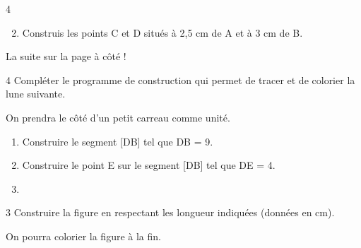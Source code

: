 \documentclass[a4paper]{book}
\begin{document}
{\begin{exerciceNote}{4}
        
        \begin{enumerate}
            \setcounter{enumi}{1}
            \item Construis les points C et D situés à 2,5 cm de A et à 3 cm de B.
        \end{enumerate}

        \begin{center}
        \end{center}
    \end{exerciceNote}

\vfill
\hfill La suite sur la page à côté !

\newpage


    \begin{exerciceNote}{4}
        Compléter le programme de construction qui permet de tracer et de colorier la lune suivante.

        On prendra le côté d'un petit carreau comme unité.
        
        \begin{center}
        \end{center}

        \begin{enumerate}
            \item Construire le segment [DB] tel que DB = 9.
            \item Construire le point E sur le segment [DB] tel que DE = 4.
            \item \points
        \end{enumerate}

        \vspace{5cm}
        
    \end{exerciceNote}


    \begin{exerciceNote}{3}
        Construire la figure en respectant les longueur indiquées (données en cm).

        On pourra colorier la figure à la fin.

        \begin{center}
        \end{center}
    \end{exerciceNote}

}
\end{document}

